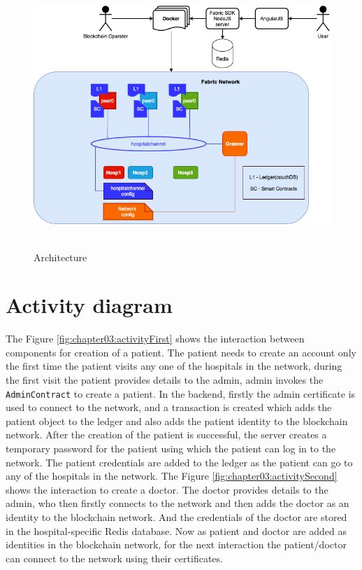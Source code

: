 \begin{figure}[htbp]
 \centering
 \includegraphics[width=1\textwidth, height=10cm]{gfx/figures/Architecture.png}
 \caption{Architecture}
 \label{fig:chapter03:architecture}
\end{figure}

%
\section{Activity diagram}
\label{sec:thesolution:network/acitivitydiagram}

The Figure \ref{fig:chapter03:activityFirst} shows the interaction between components for creation of a patient. The patient needs to create an account only the first time the patient visits any one of the hospitals in the network, during the first visit the patient provides details to the admin, admin invokes the \lstinline{AdminContract} to create a patient. In the backend, firstly the admin certificate is used to connect to the network, and a transaction is created which adds the patient object to the ledger and also adds the patient identity to the blockchain network. After the creation of the patient is successful, the server creates a temporary password for the patient using which the patient can log in to the network. The patient credentials are added to the ledger as the patient can go to any of the hospitals in the network. The Figure \ref{fig:chapter03:activitySecond} shows the interaction to create a doctor. The doctor provides details to the admin, who then firstly connects to the network and then adds the doctor as an identity to the blockchain network. And the credentials of the doctor are stored in the hospital-specific Redis database. Now as patient and doctor are added as identities in the blockchain network, for the next interaction the patient/doctor can connect to the network using their certificates.


